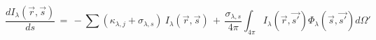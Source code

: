 \begin{equation}
\label{eq:rteExpanded}
\frac{dI_\lambda (\vec{r}, \vec{s})}{ds} \, = \, - \sum (\kappa_{\lambda,j} + \sigma_{\lambda, s}) \ I_\lambda (\vec{r}, \vec{s}) \,+\, \frac{\sigma_{\lambda, s}}{4 \pi} \int_{4 \pi} I_\lambda (\vec{r}, \vec{s'}) \Phi_\lambda(\vec{s}, \vec{s'}) d\Omega'
\end{equation}
